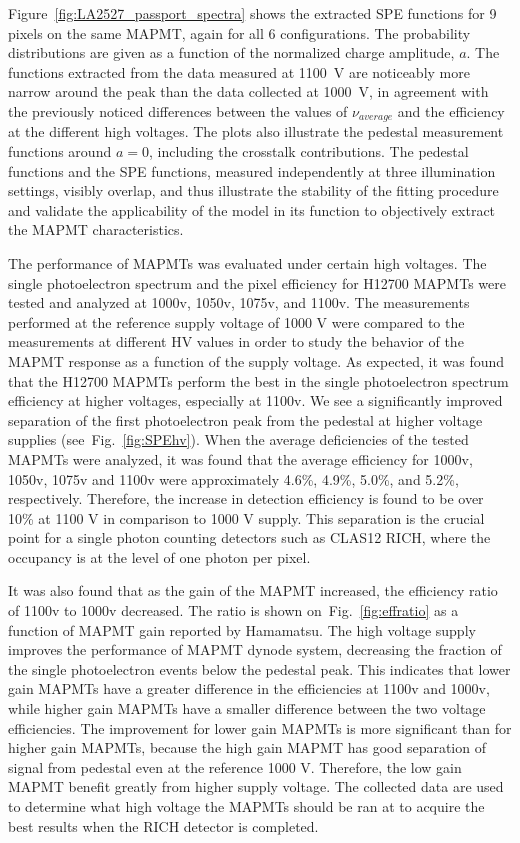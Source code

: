 Figure~\ref{fig:LA2527_passport_spectra} shows the extracted SPE functions for 9 pixels on the same MAPMT, again for all 6 configurations. The probability distributions are given as a function of the normalized charge amplitude, $a$. The functions extracted from the data measured at 1100~V are noticeably more narrow around the peak than the data collected at 1000~V, in agreement with the previously noticed differences between the values of $\nu_{average}$ and the efficiency at the different high voltages. The plots also illustrate the pedestal measurement functions around $a=0$, including the crosstalk contributions. The pedestal functions and the SPE functions, measured independently at three illumination settings, visibly overlap, and thus illustrate the stability of the fitting procedure and validate the applicability of the model in its function to objectively extract the MAPMT characteristics.


\iffalse
The performance of MAPMTs was evaluated under certain high voltages.
The single photoelectron spectrum and the pixel efficiency for H12700 MAPMTs were tested and analyzed at 1000v, 1050v, 1075v, and 1100v.
The measurements performed at the reference supply voltage of 1000 V were compared to the measurements at different HV values in order to study the behavior of the MAPMT response as a function of the supply voltage.
As expected, it was found that the H12700 MAPMTs perform the best in the single photoelectron spectrum efficiency at higher voltages, especially at 1100v.
We see a significantly improved separation of the first photoelectron peak from the pedestal at higher voltage supplies (see~Fig.~\ref{fig:SPEhv}).
When the average deficiencies of the tested MAPMTs were analyzed, it was found that the average efficiency for 1000v, 1050v, 1075v and 1100v were approximately 4.6\%, 4.9\%, 5.0\%, and 5.2\%, respectively.
Therefore, the increase in detection efficiency is found to be over 10\% at 1100 V in comparison to 1000 V supply.
This separation is the crucial point for a single photon counting detectors such as CLAS12 RICH, where the occupancy is at the level of one photon per pixel.



It was also found that as the gain of the MAPMT increased, the efficiency ratio of 1100v to 1000v decreased.
The ratio is shown on~Fig.~\ref{fig:effratio} as a function of MAPMT gain reported by Hamamatsu.
The high voltage supply improves the performance of MAPMT dynode system, decreasing the fraction of the single photoelectron events below the pedestal peak.
This indicates that lower gain MAPMTs have a greater difference in the efficiencies at 1100v and 1000v, while higher gain MAPMTs have a smaller difference between the two voltage efficiencies.
The improvement for lower gain MAPMTs is more significant than for higher gain MAPMTs, because the high gain MAPMT has good separation of signal from pedestal even at the reference 1000 V.
Therefore, the low gain MAPMT benefit greatly from higher supply voltage.
The collected data are used to determine what high voltage the MAPMTs should be ran at to acquire the best results when the RICH detector is completed.



